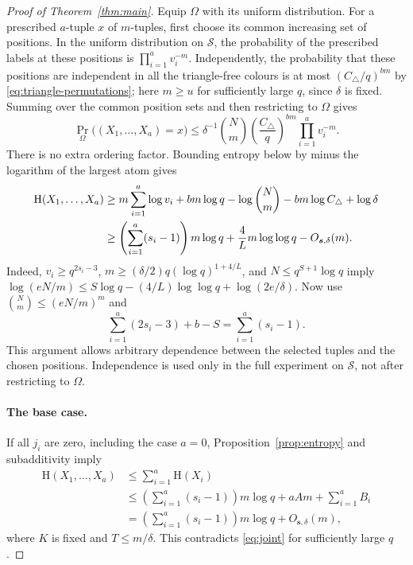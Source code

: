 \documentclass[11pt,a4paper]{article}
\numberwithin{equation}{section}
\newcommand{\HH}{\mathrm H}
\newcommand{\cS}{\mathcal S}
\begin{document}
\begin{proof}[Proof of Theorem~\ref{thm:main}]
Equip $\Omega$ with its uniform distribution.
For a prescribed $a$-tuple $x$ of $m$-tuples, first choose its
common increasing set of positions. In the uniform distribution
on $\cS$, the probability of the prescribed labels at these
positions is $\prod_{i=1}^a v_i^{-m}$.
Independently, the probability that these positions are independent
in all the triangle-free colours is at most
$(C_\triangle/q)^{bm}$ by \eqref{eq:triangle-permutations};
here $m\ge u$ for sufficiently large $q$, since $\delta$ is fixed.
Summing over the common position sets and then restricting to
$\Omega$ gives
\begin{equation}\label{eq:mixed-atom}
 \Pr_\Omega\bigl((X_1,\ldots,X_a)=x\bigr)
 \le\delta^{-1}\binom Nm
       \left(\frac{C_\triangle}{q}\right)^{bm}
       \prod_{i=1}^a v_i^{-m}.
\end{equation}
There is no extra ordering factor. Bounding entropy below by
minus the logarithm of the largest atom gives
\begin{align}
 \HH(X_1,\ldots,X_a)
 &\ge m\sum_{i=1}^a\log v_i+bm\log q-\log\binom Nm
       -bm\log C_\triangle+\log\delta\notag\\
 &\ge\left(\sum_{i=1}^a(s_i-1)\right)m\log q
       +\frac4L m\log\log q-O_{\boldsymbol{s},\delta}(m).
 \label{eq:joint}
\end{align}
Indeed, $v_i\ge q^{2s_i-3}$,
$m\ge(\delta/2)q(\log q)^{1+4/L}$, and
$N\le q^{S+1}\log q$ imply
$\log(eN/m)\le S\log q-(4/L)\log\log q+\log(2e/\delta)$.
Now use $\binom Nm\le(eN/m)^m$ and
\[
 \sum_{i=1}^a(2s_i-3)+b-S=\sum_{i=1}^a(s_i-1).
\]
This argument allows arbitrary dependence between the selected
tuples and the chosen positions. Independence is used only in
the full experiment on $\cS$, not after restricting to $\Omega$.

\paragraph{The base case.}
If all $j_i$ are zero, including the case $a=0$,
Proposition~\ref{prop:entropy} and subadditivity imply
\[
 \begin{aligned}
 \HH(X_1,\ldots,X_a)
 &\le\sum_{i=1}^a\HH(X_i)\\
 &\le\left(\sum_{i=1}^a(s_i-1)\right)m\log q+aAm+\sum_{i=1}^aB_i\\
 &=\left(\sum_{i=1}^a(s_i-1)\right)m\log q
    +O_{\boldsymbol{s},\delta}(m),
 \end{aligned}
\]
where $K$ is fixed and $T\le m/\delta$.
This contradicts \eqref{eq:joint} for sufficiently large $q$.


\end{proof}
\end{document}
